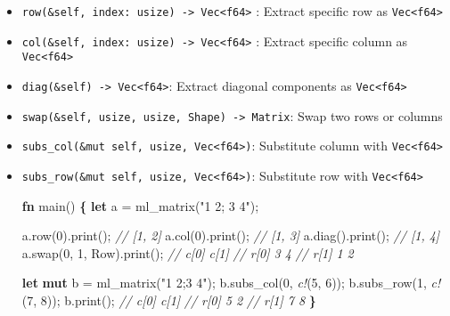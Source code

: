 \documentclass[]{book}
\newenvironment{Shaded}{\begin{snugshade}}{\end{snugshade}}
\newcommand{\CommentTok}[1]{\textcolor[rgb]{0.56,0.35,0.01}{\textit{#1}}}
\newcommand{\DecValTok}[1]{\textcolor[rgb]{0.00,0.00,0.81}{#1}}
\newcommand{\KeywordTok}[1]{\textcolor[rgb]{0.13,0.29,0.53}{\textbf{#1}}}
\newcommand{\NormalTok}[1]{#1}
\newcommand{\OperatorTok}[1]{\textcolor[rgb]{0.81,0.36,0.00}{\textbf{#1}}}
\newcommand{\PreprocessorTok}[1]{\textcolor[rgb]{0.56,0.35,0.01}{\textit{#1}}}
\newcommand{\StringTok}[1]{\textcolor[rgb]{0.31,0.60,0.02}{#1}}
\begin{document}
\begin{itemize}
\item
  \texttt{row(\&self,\ index:\ usize)\ -\textgreater{}\ Vec\textless{}f64\textgreater{}} : Extract specific row as \texttt{Vec\textless{}f64\textgreater{}}
\item
  \texttt{col(\&self,\ index:\ usize)\ -\textgreater{}\ Vec\textless{}f64\textgreater{}} : Extract specific column as \texttt{Vec\textless{}f64\textgreater{}}
\item
  \texttt{diag(\&self)\ -\textgreater{}\ Vec\textless{}f64\textgreater{}}: Extract diagonal components as \texttt{Vec\textless{}f64\textgreater{}}
\item
  \texttt{swap(\&self,\ usize,\ usize,\ Shape)\ -\textgreater{}\ Matrix}: Swap two rows or columns
\item
  \texttt{subs\_col(\&mut\ self,\ usize,\ Vec\textless{}f64\textgreater{})}: Substitute column with \texttt{Vec\textless{}f64\textgreater{}}
\item
  \texttt{subs\_row(\&mut\ self,\ usize,\ Vec\textless{}f64\textgreater{})}: Substitute row with \texttt{Vec\textless{}f64\textgreater{}}

\begin{Shaded}
\begin{Highlighting}[]
\KeywordTok{fn}\NormalTok{ main() }\OperatorTok{\{}
    \KeywordTok{let}\NormalTok{ a = ml_matrix(}\StringTok{"1 2; 3 4"}\NormalTok{);}

\NormalTok{    a.row(}\DecValTok{0}\NormalTok{).print(); }\CommentTok{// [1, 2]}
\NormalTok{    a.col(}\DecValTok{0}\NormalTok{).print(); }\CommentTok{// [1, 3]}
\NormalTok{    a.diag().print(); }\CommentTok{// [1, 4]}
\NormalTok{    a.swap(}\DecValTok{0}\NormalTok{, }\DecValTok{1}\NormalTok{, Row).print();}
    \CommentTok{//      c[0] c[1]}
    \CommentTok{// r[0]    3    4}
    \CommentTok{// r[1]    1    2}

    \KeywordTok{let} \KeywordTok{mut}\NormalTok{ b = ml_matrix(}\StringTok{"1 2;3 4"}\NormalTok{);}
\NormalTok{    b.subs_col(}\DecValTok{0}\NormalTok{, }\PreprocessorTok{c!}\NormalTok{(}\DecValTok{5}\NormalTok{, }\DecValTok{6}\NormalTok{));}
\NormalTok{    b.subs_row(}\DecValTok{1}\NormalTok{, }\PreprocessorTok{c!}\NormalTok{(}\DecValTok{7}\NormalTok{, }\DecValTok{8}\NormalTok{));}
\NormalTok{    b.print();}
    \CommentTok{//       c[0] c[1]}
    \CommentTok{// r[0]    5    2}
    \CommentTok{// r[1]    7    8}
\OperatorTok{\}}
\end{Highlighting}
\end{Shaded}
\end{itemize}
\end{document}
